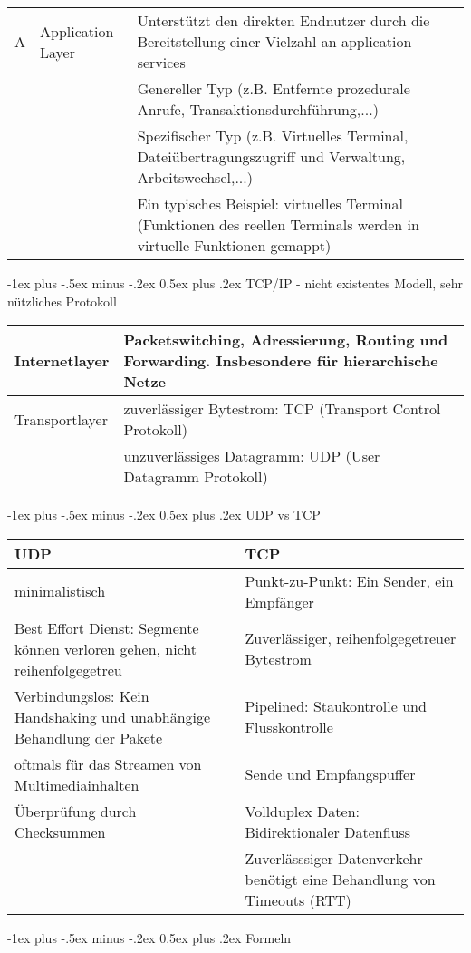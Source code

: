 \documentclass[10pt,landscape]{article}
\makeatletter
\renewcommand{\section}{\@startsection{section}{1}{0mm}%
                                {-1ex plus -.5ex minus -.2ex}%
                                {0.5ex plus .2ex}%
                                {\normalfont\large\bfseries}}
\makeatother
\begin{document}
\begin{tabular}{l | l | l}
        \hline
    A & Application Layer &
        Unterstützt den direkten Endnutzer durch die Bereitstellung einer Vielzahl an application services\\
        &&Genereller Typ (z.B. Entfernte prozedurale Anrufe, Transaktionsdurchführung,...)\\
        &&Spezifischer Typ (z.B. Virtuelles Terminal, Dateiübertragungszugriff und Verwaltung, Arbeitswechsel,...)\\
        &&Ein typisches Beispiel: virtuelles Terminal (Funktionen des reellen Terminals werden in virtuelle Funktionen gemappt)\\
\end{tabular}

\section{TCP/IP - nicht existentes Modell, sehr nützliches Protokoll}
\begin{tabular}{l | l}
    Internetlayer & Packetswitching, Adressierung, Routing und Forwarding. Insbesondere für hierarchische Netze \\
    \hline
    Transportlayer & zuverlässiger Bytestrom: TCP (Transport Control Protokoll) \\
        & unzuverlässiges Datagramm: UDP (User Datagramm Protokoll)\\
\end{tabular}

\section{UDP vs TCP}
\begin{tabular}{l | l}
    UDP & TCP \\ \hline
    minimalistisch & Punkt-zu-Punkt: Ein Sender, ein Empfänger \\
    Best Effort Dienst: Segmente können verloren gehen, nicht reihenfolgegetreu & Zuverlässiger, reihenfolgegetreuer Bytestrom \\
    Verbindungslos: Kein Handshaking und unabhängige Behandlung der Pakete & Pipelined: Staukontrolle und Flusskontrolle \\
    oftmals für das Streamen von Multimediainhalten & Sende und Empfangspuffer \\
    Überprüfung durch Checksummen & Vollduplex Daten: Bidirektionaler Datenfluss \\
    & Zuverlässsiger Datenverkehr benötigt eine Behandlung von Timeouts (RTT) \\
\end{tabular}


\section{Formeln}
\begin{multicols}{2}

\end{multicols}
\end{document}
